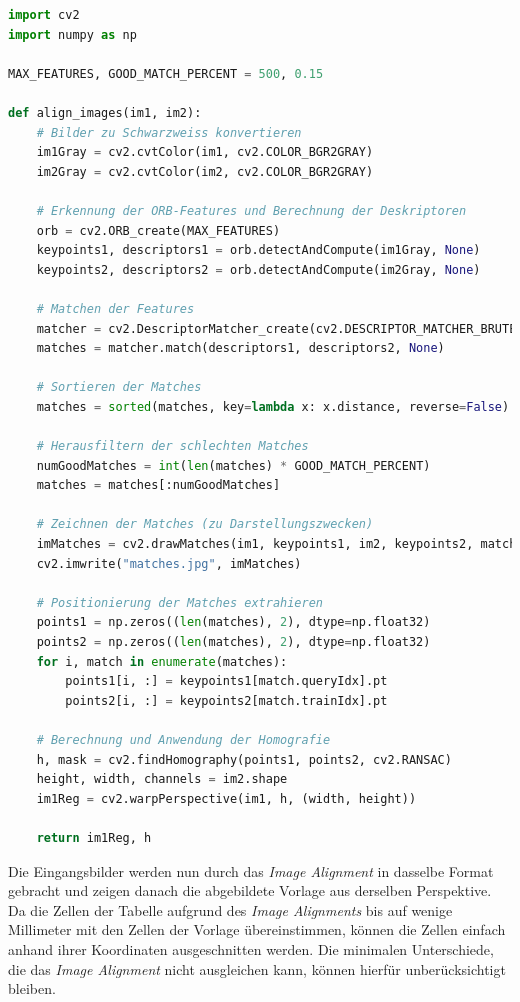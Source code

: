 \begin{minipage}{\textwidth}
	\begin{lstlisting}[language=Python, caption=Code für \textit{Image Alignment}, label=lst:align_images]
import cv2
import numpy as np

MAX_FEATURES, GOOD_MATCH_PERCENT = 500, 0.15

def align_images(im1, im2):
	# Bilder zu Schwarzweiss konvertieren
	im1Gray = cv2.cvtColor(im1, cv2.COLOR_BGR2GRAY)
	im2Gray = cv2.cvtColor(im2, cv2.COLOR_BGR2GRAY)

	# Erkennung der ORB-Features und Berechnung der Deskriptoren
	orb = cv2.ORB_create(MAX_FEATURES)
	keypoints1, descriptors1 = orb.detectAndCompute(im1Gray, None)
	keypoints2, descriptors2 = orb.detectAndCompute(im2Gray, None)

	# Matchen der Features
	matcher = cv2.DescriptorMatcher_create(cv2.DESCRIPTOR_MATCHER_BRUTEFORCE_HAMMING)
	matches = matcher.match(descriptors1, descriptors2, None)

	# Sortieren der Matches
	matches = sorted(matches, key=lambda x: x.distance, reverse=False)

	# Herausfiltern der schlechten Matches
	numGoodMatches = int(len(matches) * GOOD_MATCH_PERCENT)
	matches = matches[:numGoodMatches]

	# Zeichnen der Matches (zu Darstellungszwecken)
	imMatches = cv2.drawMatches(im1, keypoints1, im2, keypoints2, matches, None)
	cv2.imwrite("matches.jpg", imMatches)

	# Positionierung der Matches extrahieren
	points1 = np.zeros((len(matches), 2), dtype=np.float32)
	points2 = np.zeros((len(matches), 2), dtype=np.float32)
	for i, match in enumerate(matches):
		points1[i, :] = keypoints1[match.queryIdx].pt
		points2[i, :] = keypoints2[match.trainIdx].pt

	# Berechnung und Anwendung der Homografie
	h, mask = cv2.findHomography(points1, points2, cv2.RANSAC)
	height, width, channels = im2.shape
	im1Reg = cv2.warpPerspective(im1, h, (width, height))

	return im1Reg, h
	\end{lstlisting}
\end{minipage}

Die Eingangsbilder werden nun durch das \textit{Image Alignment} in dasselbe Format gebracht und zeigen danach die abgebildete Vorlage aus derselben Perspektive.
Da die Zellen der Tabelle aufgrund des \textit{Image Alignments} bis auf wenige Millimeter mit den Zellen der Vorlage übereinstimmen, können die Zellen einfach
anhand ihrer Koordinaten ausgeschnitten werden. Die minimalen Unterschiede, die das \textit{Image Alignment} nicht ausgleichen kann, können hierfür unberücksichtigt
bleiben.

